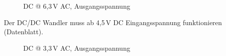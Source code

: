 \documentclass[ngerman,11pt,parskip=half] {scrartcl}
\newcommand {\tscopesize}{12cm}
\begin{document}
\begin{figure}[H]
\centering
{}
\caption{DC @ 6,3\,V AC, Ausgangsspannung} \label{fig:1}
\end{figure}

Der DC/DC Wandler muss ab 4,5\,V DC Eingangsspannung funktionieren (Datenblatt).

\begin{figure}[H]
\centering
{}
\caption{DC @ 3,3\,V AC, Ausgangsspannung} \label{fig:1}
\end{figure}
\end{document}
